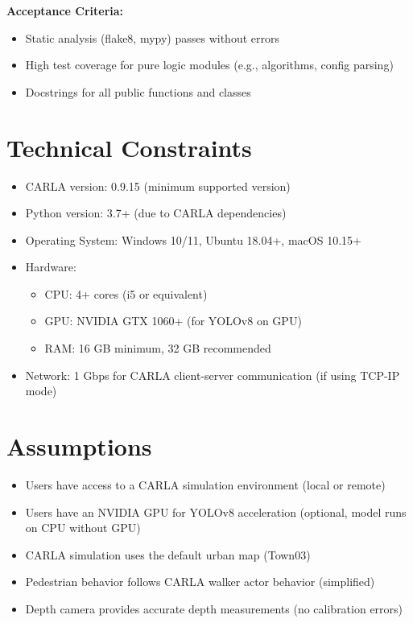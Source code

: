 \textbf{Acceptance Criteria:}
\begin{itemize}
    \item Static analysis (flake8, mypy) passes without errors
    \item High test coverage for pure logic modules (e.g., algorithms, config parsing)
    \item Docstrings for all public functions and classes
\end{itemize}

\section{Technical Constraints}

\begin{itemize}
    \item CARLA version: 0.9.15 (minimum supported version)
    \item Python version: 3.7+ (due to CARLA dependencies)
    \item Operating System: Windows 10/11, Ubuntu 18.04+, macOS 10.15+
    \item Hardware:
    \begin{itemize}
        \item CPU: 4+ cores (i5 or equivalent)
        \item GPU: NVIDIA GTX 1060+ (for YOLOv8 on GPU)
        \item RAM: 16 GB minimum, 32 GB recommended
    \end{itemize}
    \item Network: 1 Gbps for CARLA client-server communication (if using TCP-IP mode)
\end{itemize}

\section{Assumptions}

\begin{itemize}
    \item Users have access to a CARLA simulation environment (local or remote)
    \item Users have an NVIDIA GPU for YOLOv8 acceleration (optional, model runs on CPU without GPU)
    \item CARLA simulation uses the default urban map (Town03)
    \item Pedestrian behavior follows CARLA walker actor behavior (simplified)
    \item Depth camera provides accurate depth measurements (no calibration errors)
\end{itemize}

